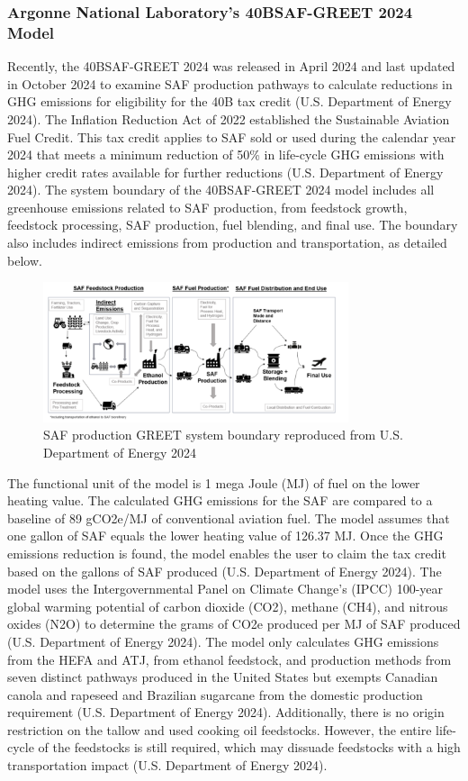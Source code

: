 \documentclass[12pt]{article}
\begin{document}
\begin{Appendix}
\subsubsection{Argonne National Laboratory’s 40BSAF-GREET 2024 Model
}
Recently, the 40BSAF-GREET 2024 was released in April 2024 and last updated in October 2024 to examine SAF production pathways to calculate reductions in GHG emissions for eligibility for the 40B tax credit (U.S. Department of Energy 2024). The Inflation Reduction Act of 2022 established the Sustainable Aviation Fuel Credit. This tax credit applies to SAF sold or used during the calendar year 2024 that meets a minimum reduction of 50\% in life-cycle GHG emissions with higher credit rates available for further reductions (U.S. Department of Energy 2024). The system boundary of the 40BSAF-GREET 2024 model includes all greenhouse emissions related to SAF production, from feedstock growth, feedstock processing, SAF production, fuel blending, and final use. The boundary also includes indirect emissions from production and transportation, as detailed below. 

\begin{figure}[H]
\centering
\includegraphics[width=0.8\textwidth]{Figure 11.png} %
\caption{SAF production GREET system boundary reproduced from U.S. Department of Energy 2024}
\label{fig:figure11}
\end{figure}

The functional unit of the model is 1 mega Joule (MJ) of fuel on the lower heating value. The calculated GHG emissions for the SAF are compared to a baseline of 89 gCO2e/MJ of conventional aviation fuel. The model assumes that one gallon of SAF equals the lower heating value of 126.37 MJ. Once the GHG emissions reduction is found, the model enables the user to claim the tax credit based on the gallons of SAF produced (U.S. Department of Energy 2024). The model uses the Intergovernmental Panel on Climate Change’s (IPCC) 100-year global warming potential of carbon dioxide (CO2), methane (CH4), and nitrous oxides (N2O) to determine the grams of CO2e produced per MJ of SAF produced (U.S. Department of Energy 2024). The model only calculates GHG emissions from the HEFA and ATJ, from ethanol feedstock, and production methods from seven distinct pathways produced in the United States but exempts Canadian canola and rapeseed and Brazilian sugarcane from the domestic production requirement (U.S. Department of Energy 2024). 
Additionally, there is no origin restriction on the tallow and used cooking oil feedstocks. However, the entire life-cycle of the feedstocks is still required, which may dissuade feedstocks with a high transportation impact (U.S. Department of Energy 2024). 



\end{Appendix}
\end{document}
